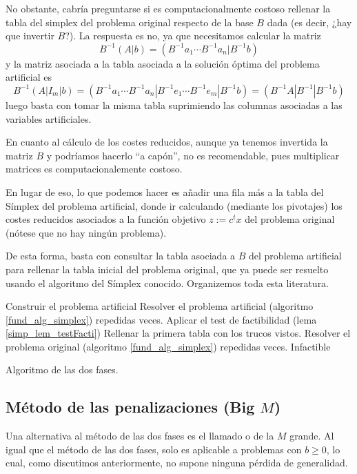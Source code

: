 No obstante, cabría preguntarse si es computacionalmente costoso rellenar la tabla del simplex del problema original respecto de la base $B$ dada (es decir, ¿hay que invertir $B$?). La respuesta es no, ya que necesitamos calcular la matriz
\begin{equation*}
	B^{-1}(A|b)=(B^{-1}a_1\cdots B^{-1}a_n|B^{-1}b)
\end{equation*}
y la matriz asociada a la tabla asociada a la solución óptima del problema artificial es
\begin{equation*}
	B^{-1}(A|I_m|b)=(B^{-1}a_1\cdots B^{-1}a_n|B^{-1}e_1\cdots B^{-1}e_m|B^{-1}b)=(B^{-1}A|B^{-1}|B^{-1}b)
\end{equation*}
luego basta con tomar la misma tabla suprimiendo las columnas asociadas a las variables artificiales.

En cuanto al cálculo de los costes reducidos, aunque ya tenemos invertida la matriz $B$ y podríamos hacerlo ``a capón'', no es recomendable, pues multiplicar matrices es computacionalemente costoso.

En lugar de eso, lo que podemos hacer es añadir una fila más a la tabla del Símplex del problema artificial, donde ir calculando (mediante los pivotajes) los costes reducidos asociados a la función objetivo $z:=c^tx$ del problema original (nótese que no hay ningún problema).

De esta forma, basta con consultar la tabla asociada a $B$ del problema artificial para rellenar la tabla inicial del problema original, que ya puede ser resuelto usando el algoritmo del Símplex conocido. Organizemos toda esta literatura.
\begin{algorithm}[H]
	\begin{algorithmic}[1]
		\STATE{}
			\STATE Construir el problema artificial
			\STATE Resolver el problema artificial (algoritmo \ref{fund_alg_simplex}) repedidas veces.
			\STATE Aplicar el test de factibilidad (lema \ref{simp_lem_testFacti})
				\STATE{}
				\STATE Rellenar la primera tabla con los trucos vistos.
				\STATE Resolver el problema original (algoritmo \ref{fund_alg_simplex}) repedidas veces.
			\ELSE
				\RETURN Infactible
			\ENDIF
	\end{algorithmic}
	\caption{Algoritmo de las dos fases.}\label{simp_alg_dosFases}
\end{algorithm}
\subsection{Método de las penalizaciones (Big $M$)}
Una alternativa al método de las dos fases es el llamado  o de la $M$ grande. Al igual que el método de las dos fases, solo es aplicable a problemas con $b\geq 0$, lo cual, como discutimos anteriormente, no supone ninguna pérdida de generalidad.

